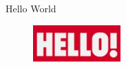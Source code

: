 \documentclass{report}
\begin{document}
  Hello World

  \begin{figure}
    \centering
    \includegraphics[width=0.3\textwidth]{Hello.jpg}
  \end{figure}
  
\end{document}

